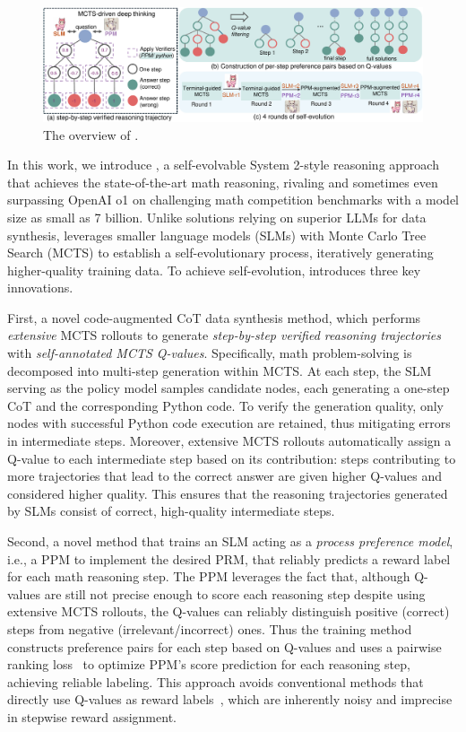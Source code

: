\begin{figure}[t]
	\centering
	\includegraphics[width=1\textwidth]{method_final.pdf}	
	\vspace{-4ex}
	\caption{The overview of {\sysname}.}
	\label{fig:method}
\end{figure}

In this work, we introduce \textbf{\sysname}, a self-evolvable System 2-style reasoning approach that achieves the state-of-the-art math reasoning, rivaling and sometimes even surpassing OpenAI o1 on challenging math competition benchmarks with a model size as small as 7 billion. Unlike solutions relying on superior LLMs for data synthesis, {\sysname} leverages smaller language models (SLMs) with Monte Carlo Tree Search (MCTS) to establish a self-evolutionary process, iteratively generating higher-quality training data. To achieve self-evolution, {\sysname} introduces three key innovations. 

First, a novel code-augmented CoT data synthesis method, which performs \textit{extensive} MCTS rollouts to generate \textit{step-by-step verified reasoning trajectories} with \textit{self-annotated MCTS Q-values}. Specifically, math problem-solving is decomposed into multi-step generation within MCTS. At each step, the SLM serving as the policy model samples candidate nodes, each generating a one-step CoT and the corresponding Python code. To verify the generation quality, only nodes with successful Python code execution are retained, thus mitigating errors in intermediate steps. Moreover, extensive MCTS rollouts automatically assign a Q-value to each intermediate step based on its contribution: steps contributing to more trajectories that lead to the correct answer are given higher Q-values and considered higher quality. This ensures that the reasoning trajectories generated by SLMs consist of correct, high-quality intermediate steps.



Second, a novel method that trains an SLM acting as a \textit{process preference model}, i.e., a PPM to implement the desired PRM, that reliably predicts a reward label for each math reasoning step. The PPM leverages the fact that, although Q-values are still not precise enough to score each reasoning step despite using extensive MCTS rollouts, the Q-values can reliably distinguish positive (correct) steps from negative (irrelevant/incorrect) ones. Thus the training method constructs preference pairs for each step based on Q-values and uses a pairwise ranking loss~\citep{instructgpt} to optimize PPM's score prediction for each reasoning step, achieving reliable labeling. This approach avoids conventional methods that directly use Q-values as reward labels~\citep{luo2024improve,alphamath}, which are inherently noisy and imprecise in stepwise reward assignment.




